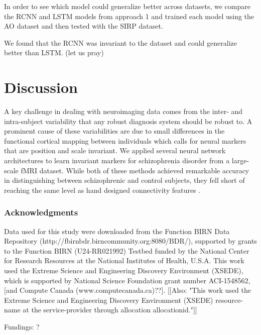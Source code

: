 \documentclass{article} %
\begin{document}
In order to see which model could generalize better across datasets, we compare the RCNN and LSTM models from approach 1 and trained each model using the AO dataset and then tested with the SIRP dataset.

We found that the RCNN was invariant to the dataset and could generalize better than LSTM. (let us pray)

\section{Discussion}
A key challenge in dealing with neuroimaging data comes from the inter- and intra-subject variability that any robust diagnosis system should be robust to. A prominent cause of these variabilities are due to small differences in the functional cortical mapping between individuals which calls for neural markers that are position and scale invariant. We applied several neural network architectures to learn invariant markers for schizophrenia disorder from a large-scale fMRI dataset. While both of these methods achieved remarkable accuracy in distinguishing between schizophrenic and control subjects, they fell short of reaching the same level as hand designed connectivity features \citep{Gheiratmand2017}.


\subsubsection*{Acknowledgments}

Data used for this study were downloaded from the Function BIRN Data Repository (http://fbirnbdr.birncommunity.org:8080/BDR/), supported by grants to the Function BIRN (U24-RR021992) Testbed funded by the National Center for Research Resources at the National Institutes of Health, U.S.A.
This work used the Extreme Science and Engineering Discovery Environment (XSEDE), which is supported by National Science Foundation grant number ACI-1548562, [and Compute Canada (www.computecanada.ca)??].
[[Also: "This work used the Extreme Science and Engineering Discovery Environment (XSEDE) resource-name at the service-provider through allocation allocationid."]]

Fundings: ?




\end{document}
